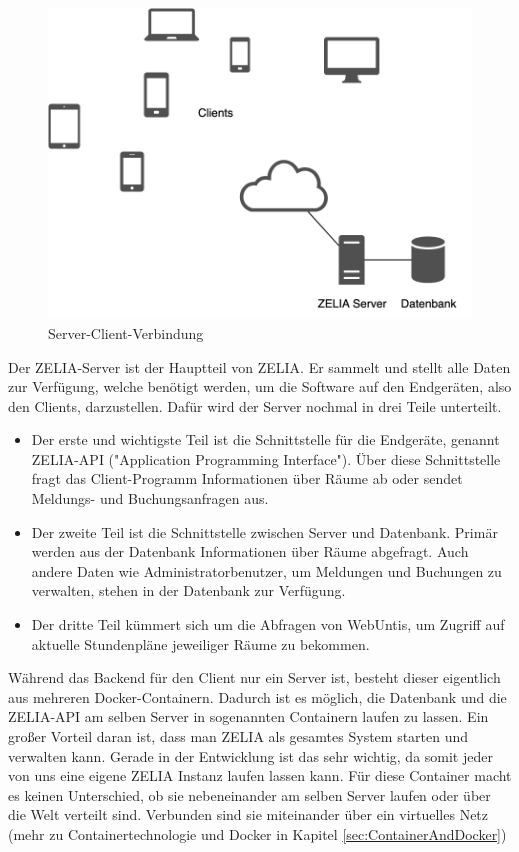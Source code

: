 \begin{figure}[H]
    \centering
    \includegraphics[width=120mm]{./media/Intro/client_server_arch.png}
    \caption{Server-Client-Verbindung}
\end{figure}


Der ZELIA-Server ist der Hauptteil von ZELIA. Er sammelt und stellt alle Daten zur Verfügung, welche benötigt werden, um die Software auf den Endgeräten, also den Clients, darzustellen. Dafür wird der Server nochmal in drei Teile unterteilt.

\begin{itemize}
    \item Der erste und wichtigste Teil ist die Schnittstelle für die Endgeräte, genannt ZELIA-API ("Application Programming Interface"). Über diese Schnittstelle fragt das Client-Programm Informationen über Räume ab oder sendet Meldungs- und Buchungsanfragen aus.
    \item Der zweite Teil ist die Schnittstelle zwischen Server und Datenbank. Primär werden aus der Datenbank Informationen über Räume abgefragt. Auch andere Daten wie Administratorbenutzer, um Meldungen und Buchungen zu verwalten, stehen in der Datenbank zur Verfügung. 
    \item Der dritte Teil kümmert sich um die Abfragen von WebUntis, um Zugriff auf aktuelle Stundenpläne jeweiliger Räume zu bekommen.
\end{itemize}

Während das Backend für den Client nur ein Server ist, besteht dieser eigentlich aus mehreren Docker-Containern. Dadurch ist es möglich, die Datenbank und die ZELIA-API am selben Server in sogenannten Containern laufen zu lassen. Ein großer Vorteil daran ist, dass man ZELIA als gesamtes System starten und verwalten kann. Gerade in der Entwicklung ist das sehr wichtig, da somit jeder von uns eine eigene ZELIA Instanz laufen lassen kann. Für diese Container macht es keinen Unterschied, ob sie nebeneinander am selben Server laufen oder über die Welt verteilt sind. Verbunden sind sie miteinander über ein virtuelles Netz (mehr zu Containertechnologie und Docker in Kapitel \ref{sec:ContainerAndDocker})


